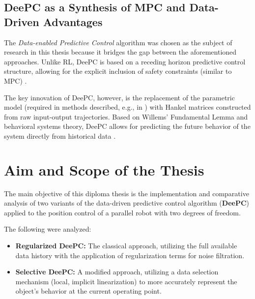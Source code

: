 \subsection{DeePC as a Synthesis of MPC and Data-Driven Advantages}
The \textit{Data-enabled Predictive Control} algorithm was chosen as the subject of research in this thesis because it bridges the gap between the aforementioned approaches. Unlike RL, DeePC is based on a receding horizon predictive control structure, allowing for the explicit inclusion of safety constraints (similar to MPC) \cite{nmpc, deepc, ethzurich}.

The key innovation of DeePC, however, is the replacement of the parametric model (required in methods described, e.g., in \cite{tatiewski, nmpc}) with Hankel matrices constructed from raw input-output trajectories. Based on Willems' Fundamental Lemma and behavioral systems theory, DeePC allows for predicting the future behavior of the system directly from historical data \cite{deepc, WILLEMS2005325}.

\section{Aim and Scope of the Thesis}

The main objective of this diploma thesis is the implementation and comparative analysis of two variants of the data-driven predictive control algorithm (\textbf{DeePC}) applied to the position control of a parallel robot with two degrees of freedom.

The following were analyzed:
\begin{itemize}
    \item \textbf{Regularized DeePC:} The classical approach, utilizing the full available data history with the application of regularization terms for noise filtration.
    \item \textbf{Selective DeePC:} A modified approach, utilizing a data selection mechanism (local, implicit linearization) to more accurately represent the object's behavior at the current operating point.
\end{itemize}

